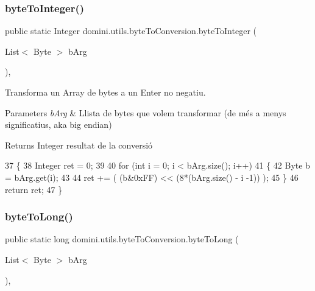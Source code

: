 \subsubsection{\texorpdfstring{byte\+To\+Integer()}{byteToInteger()}}
{\footnotesize\ttfamily public static Integer domini.\+utils.\+byte\+To\+Conversion.\+byte\+To\+Integer (\begin{DoxyParamCaption}\item[{List$<$ Byte $>$}]{b\+Arg }\end{DoxyParamCaption})\hspace{0.3cm}{\ttfamily [inline]}, {\ttfamily [static]}}



Transforma un Array de bytes a un Enter no negatiu. 


\begin{DoxyParams}{Parameters}
{\em b\+Arg} & Llista de bytes que volem transformar (de més a menys significatius, aka big endian) \\
\hline
\end{DoxyParams}
\begin{DoxyReturn}{Returns}
Integer resultat de la conversió 
\end{DoxyReturn}

\begin{DoxyCode}
37     \{
38         Integer ret = 0;
39 
40         \textcolor{keywordflow}{for} (\textcolor{keywordtype}{int} i = 0; i < bArg.size(); i++)
41         \{
42             Byte b = bArg.get(i);
43             
44             ret += ( (b&0xFF) << (8*(bArg.size() - i -1)) );
45         \}
46         \textcolor{keywordflow}{return} ret;
47     \}
\end{DoxyCode}
\mbox{\label{classdomini_1_1utils_1_1byteToConversion_a18600284c32cae9284c16c6396425d5a}} 
\subsubsection{\texorpdfstring{byte\+To\+Long()}{byteToLong()}}
{\footnotesize\ttfamily public static long domini.\+utils.\+byte\+To\+Conversion.\+byte\+To\+Long (\begin{DoxyParamCaption}\item[{List$<$ Byte $>$}]{b\+Arg }\end{DoxyParamCaption})\hspace{0.3cm}{\ttfamily [inline]}, {\ttfamily [static]}}




